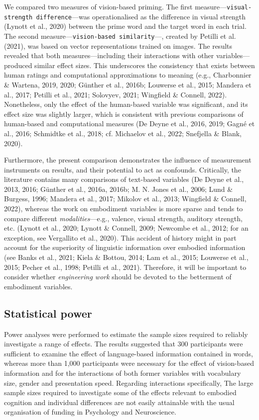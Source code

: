 \documentclass[
  12pt,
  man,floatsintext]{apa7}
\begin{document}
We compared two measures of vision-based priming. The first measure---\texttt{visual-strength\ difference}---was operationalised as the difference in visual strength (Lynott et al., 2020) between the prime word and the target word in each trial. The second measure---\texttt{vision-based\ similarity}---, created by Petilli et al. (2021), was based on vector representations trained on images. The results revealed that both measures---including their interactions with other variables---produced similar effect sizes. This underscores the consistency that exists between human ratings and computational approximations to meaning (e.g., Charbonnier \& Wartena, 2019, 2020; Günther et al., 2016b; Louwerse et al., 2015; Mandera et al., 2017; Petilli et al., 2021; Solovyev, 2021; Wingfield \& Connell, 2022). Nonetheless, only the effect of the human-based variable was significant, and its effect size was slightly larger, which is consistent with previous comparisons of human-based and computational measures (De Deyne et al., 2016, 2019; Gagné et al., 2016; Schmidtke et al., 2018; cf. Michaelov et al., 2022; Snefjella \& Blank, 2020).

Furthermore, the present comparison demonstrates the influence of measurement instruments on results, and their potential to act as confounds. Critically, the literature contains many comparisons of text-based variables (De Deyne et al., 2013, 2016; Günther et al., 2016a, 2016b; M. N. Jones et al., 2006; Lund \& Burgess, 1996; Mandera et al., 2017; Mikolov et al., 2013; Wingfield \& Connell, 2022), whereas the work on embodiment variables is more sparse and tends to compare different \emph{modalities}---e.g., valence, visual strength, auditory strength, etc. (Lynott et al., 2020; Lynott \& Connell, 2009; Newcombe et al., 2012; for an exception, see Vergallito et al., 2020). This accident of history might in part account for the superiority of linguistic information over embodied information (see Banks et al., 2021; Kiela \& Bottou, 2014; Lam et al., 2015; Louwerse et al., 2015; Pecher et al., 1998; Petilli et al., 2021). Therefore, it will be important to consider whether \emph{engineering work} should be devoted to the betterment of embodiment variables.

\hypertarget{statistical-power}{%
\subsection{Statistical power}\label{statistical-power}}

Power analyses were performed to estimate the sample sizes required to reliably investigate a range of effects. The results suggested that 300 participants were sufficient to examine the effect of language-based information contained in words, whereas more than 1,000 participants were necessary for the effect of vision-based information and for the interactions of both former variables with vocabulary size, gender and presentation speed. Regarding interactions specifically, The large sample sizes required to investigate some of the effects relevant to embodied cognition and individual differences are not easily attainable with the usual organisation of funding in Psychology and Neuroscience.
\end{document}
